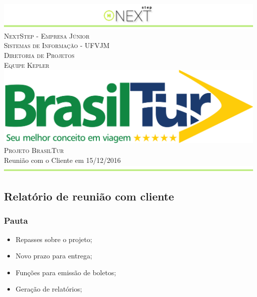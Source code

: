 \documentclass[a4paper, 12pt]{article}
\newcommand\datareuniao{15/12/2016}
\newcommand\equipe{Equipe Kepler}
\newcommand\projeto{Projeto BrasilTur}
\newcommand\titulo{Reunião com o Cliente em \datareuniao}
\begin{document}
\begin{titlepage}

\begin{center}
\includegraphics[width=\linewidth]{../../images/next_step_logo.png} \\[0.8cm]
\textsc{\LARGE NextStep - Empresa Júnior} \\[0.2cm]
\textsc{\LARGE Sistemas de Informação - UFVJM} \\[0.2cm]
\textsc{\LARGE Diretoria de Projetos} \\[0.2cm]
\textsc{\equipe} \\[1.3cm]
\vfill
\includegraphics[width=0.3\linewidth]{../../../img/brtur1.png} \\[0.8cm]
\textsc{\LARGE \projeto} \\[0.8cm]
\vfill
\vfill
{\LARGE \titulo \\[0.4cm]}
\includegraphics[width=\linewidth]{../../images/jc_rodape.png} \\[0.8cm]
\end{center}
\end{titlepage}
\clearpage
\subsection*{Relatório de reunião com cliente}


\subsubsection*{Pauta}
\begin{itemize}
	\item Repasses sobre o projeto;
	\item Novo prazo para entrega;
	\item Funções para emissão de boletos;
	\item Geração de relatórios;
\end{itemize}
\end{document}
